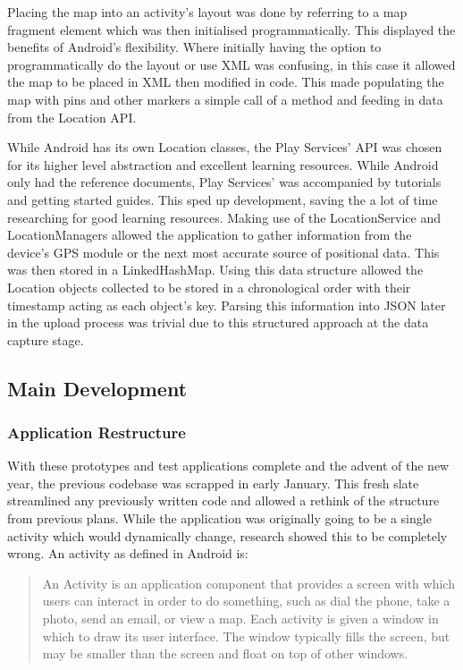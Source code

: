 \documentclass{l3proj}
\begin{document}
Placing the map into an activity's layout was done by referring to a map fragment element which was then initialised programmatically. This displayed the benefits of Android's flexibility. Where initially having the option to programmatically do the layout or use XML was confusing, in this case it allowed the map to be placed in XML then modified in code. This made populating the map with pins and other markers a simple call of a method and feeding in data from the Location \gls{API}.

While Android has its own Location classes, the Play Services' API was chosen for its higher level abstraction and excellent learning resources. While Android only had the reference documents, Play Services' was accompanied by tutorials and getting started guides. This sped up development, saving the a lot of time researching for good learning resources. Making use of the LocationService and LocationManagers allowed the application to gather information from the device's GPS module or the next most accurate source of positional data. This was then stored in a LinkedHashMap. Using this data structure allowed the Location objects collected to be stored in a chronological order with their timestamp acting as each object's key. Parsing this information into JSON later in the upload process was trivial due to this structured approach at the data capture stage.

\subsection{Main Development}
\subsubsection{Application Restructure}
With these prototypes and test applications complete and the advent of the new year, the previous codebase was scrapped in early January. This fresh slate streamlined any previously written code and allowed a rethink of the structure from previous plans. While the application was originally going to be a single activity which would dynamically change, research showed this to be completely wrong. An activity as defined in Android is:

\blockquote{An Activity is an application component that provides a screen with which users can interact in order to do something, such as dial the phone, take a photo, send an email, or view a map. Each activity is given a window in which to draw its user interface. The window typically fills the screen, but may be smaller than the screen and float on top of other windows.}
\end{document}
